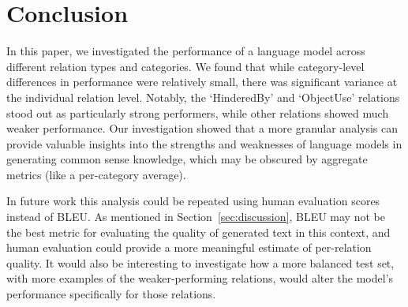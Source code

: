 \section{Conclusion}
\label{sec:conclusion}


In this paper, we investigated the performance of a language model across different relation types and categories. We found that while category-level differences in performance were relatively small, there was significant variance at the individual relation level. Notably, the `HinderedBy' and `ObjectUse' relations stood out as particularly strong performers, while other relations showed much weaker performance. Our investigation showed that a more granular analysis can provide valuable insights into the strengths and weaknesses of language models in generating common sense knowledge, which may be obscured by aggregate metrics (like a per-category average).


In future work this analysis could be repeated using human evaluation scores instead of BLEU. As mentioned in Section~\ref{sec:discussion}, BLEU may not be the best metric for evaluating the quality of generated text in this context, and human evaluation could provide a more meaningful estimate of per-relation quality. It would also be interesting to investigate how a more balanced test set, with more examples of the weaker-performing relations, would alter the model's performance specifically for those relations.

